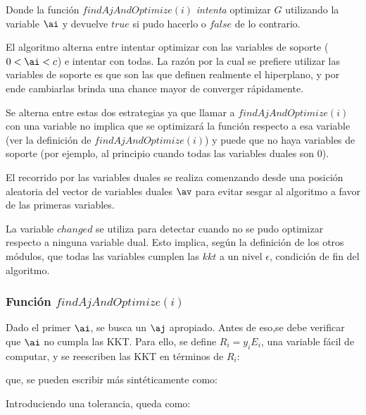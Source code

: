 Donde la función $findAjAndOptimize(i)$ \textit{intenta} optimizar $G$ utilizando la variable $\ai$ y devuelve $true$ si pudo hacerlo o $false$ de lo contrario. 

El algoritmo alterna entre intentar optimizar con las variables de soporte ($0<\ai<c$) e intentar con todas. La razón por la cual se prefiere utilizar las variables de soporte es que son las que definen realmente el hiperplano, y por ende cambiarlas brinda una chance mayor de converger rápidamente. 

Se alterna entre estas dos estrategias ya que llamar a $findAjAndOptimize(i)$ con una variable no implica que se optimizará la función respecto a esa variable (ver la definición de $findAjAndOptimize(i)$) y puede que no haya variables de soporte (por ejemplo, al principio cuando todas las variables duales son $0$).

El recorrido por las variables duales se realiza comenzando desde una posición aleatoria del vector de variables duales $\av$ para evitar sesgar al algoritmo a favor de las primeras variables.

La variable $changed$ se utiliza para detectar cuando no se pudo optimizar respecto a ninguna variable dual. Esto implica, según la definición de los otros módulos, que todas las variables cumplen las $kkt$ a un nivel $\epsilon$, condición de fin del algoritmo. 

\subsubsection{Función $findAjAndOptimize(i)$}

Dado el primer $\ai$, se busca un $\aj$ apropiado. Antes de eso,se debe verificar que $\ai$ no cumpla las KKT. Para ello, se define $R_i=y_i E_i$, una variable fácil de computar, y se reescriben las KKT en términos de $R_i$:


que, se pueden escribir más sintéticamente como:


Introduciendo una tolerancia, queda como:





